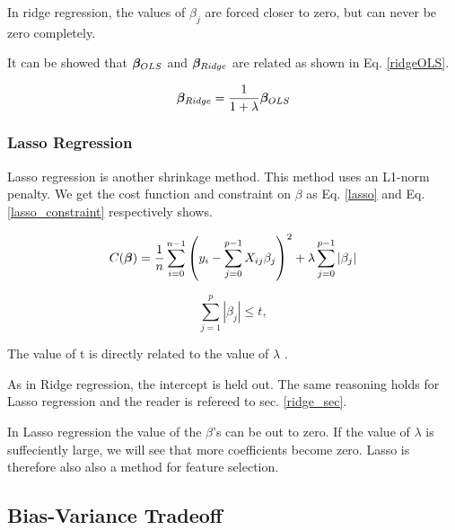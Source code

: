 In ridge regression, the values of $\beta_j$ are forced closer to zero, but can never be zero completely. 

It can be showed that $\boldsymbol{\beta}_{OLS}$ and $\boldsymbol{\beta}_{Ridge}$ are related as shown in Eq. \ref{ridgeOLS}. 

\begin{equation}\label{ridgeOLS}
    \boldsymbol{\beta}_{Ridge} = \frac{1}{1+\lambda}\boldsymbol{\beta}_{OLS}
\end{equation}




\subsubsection{Lasso Regression}

Lasso regression is another shrinkage method. This method uses an L1-norm penalty. We get the cost function and constraint on $\beta$ as Eq. \ref{lasso} and Eq. \ref{lasso_constraint} respectively shows. 

\begin{equation}\label{lasso}
     C(\boldsymbol{\beta}) = \frac{1}{n} \sum_{i=0}^{n-1} \left( y_i - \sum_{j=0}^{p-1} X_{ij}\beta_j \right)^2 + \lambda\sum_{j=0}^{p-1} |\beta_j|
\end{equation}

\begin{equation}\label{lasso_constraint}
    \sum_{j=1}^p | \beta_j | \leq t, 
\end{equation}


The value of t is directly related to the value of $\lambda$ \citep[p. 68]{hastie}.


As in Ridge regression, the intercept is held out. The same reasoning holds for Lasso regression and the reader is refereed to sec. \ref{ridge_sec}.

In Lasso regression the value of the $\beta$'s can be out to zero. If the value of $\lambda$ is suffeciently large, we will see that more coefficients become zero. Lasso is therefore also also a method for feature selection. 



\subsection{Bias-Variance Tradeoff}

